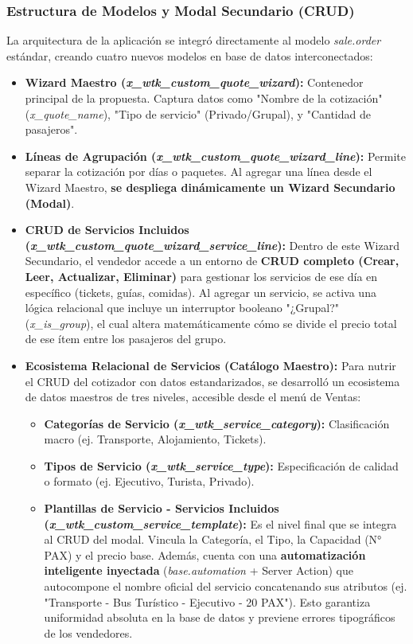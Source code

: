 \subsubsection*{Estructura de Modelos y Modal Secundario (CRUD)}
La arquitectura de la aplicación se integró directamente al modelo \textit{sale.order} estándar, creando cuatro nuevos modelos en base de datos interconectados:
\begin{itemize}[leftmargin=*]
    \item \textbf{Wizard Maestro (\textit{x\_wtk\_custom\_quote\_wizard}):} Contenedor principal de la propuesta. Captura datos como "Nombre de la cotización" (\textit{x\_quote\_name}), "Tipo de servicio" (Privado/Grupal), y "Cantidad de pasajeros".
    \item \textbf{Líneas de Agrupación (\textit{x\_wtk\_custom\_quote\_wizard\_line}):} Permite separar la cotización por días o paquetes. Al agregar una línea desde el Wizard Maestro, \textbf{se despliega dinámicamente un Wizard Secundario (Modal)}.
    \item \textbf{CRUD de Servicios Incluidos (\textit{x\_wtk\_custom\_quote\_wizard\_service\_line}):} Dentro de este Wizard Secundario, el vendedor accede a un entorno de \textbf{CRUD completo (Crear, Leer, Actualizar, Eliminar)} para gestionar los servicios de ese día en específico (tickets, guías, comidas). Al agregar un servicio, se activa una lógica relacional que incluye un interruptor booleano "¿Grupal?" (\textit{x\_is\_group}), el cual altera matemáticamente cómo se divide el precio total de ese ítem entre los pasajeros del grupo.
    \item \textbf{Ecosistema Relacional de Servicios (Catálogo Maestro):} Para nutrir el CRUD del cotizador con datos estandarizados, se desarrolló un ecosistema de datos maestros de tres niveles, accesible desde el menú de Ventas:
    \begin{itemize}[leftmargin=*]
        \item \textbf{Categorías de Servicio (\textit{x\_wtk\_service\_category}):} Clasificación macro (ej. Transporte, Alojamiento, Tickets).
        \item \textbf{Tipos de Servicio (\textit{x\_wtk\_service\_type}):} Especificación de calidad o formato (ej. Ejecutivo, Turista, Privado).
        \item \textbf{Plantillas de Servicio - Servicios Incluidos (\textit{x\_wtk\_custom\_service\_template}):} Es el nivel final que se integra al CRUD del modal. Vincula la Categoría, el Tipo, la Capacidad (N° PAX) y el precio base. Además, cuenta con una \textbf{automatización inteligente inyectada} (\textit{base.automation} + Server Action) que autocompone el nombre oficial del servicio concatenando sus atributos (ej. "Transporte - Bus Turístico - Ejecutivo - 20 PAX"). Esto garantiza uniformidad absoluta en la base de datos y previene errores tipográficos de los vendedores.
    \end{itemize}
\end{itemize}

